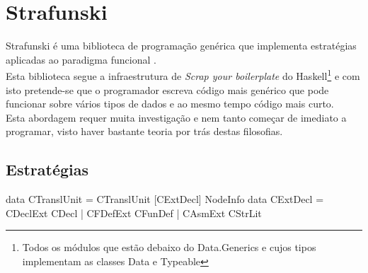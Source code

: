 \chapter{Strafunski}
\minitoc

Strafunski é uma biblioteca de programação genérica que implementa estratégias aplicadas ao paradigma funcional \cite{Lammel:2002:DPF:570186.570187,LV03-PADL}.\\
Esta biblioteca segue a infraestrutura de \textit{Scrap your boilerplate} \cite{SYB3} do
Haskell\footnote{Todos os módulos que estão debaixo do Data.Generics e cujos tipos implementam as classes Data e Typeable} e com isto pretende-se que o programador
escreva código mais genérico que pode funcionar sobre vários tipos de dados e ao mesmo tempo código mais curto.\\
Esta abordagem requer muita investigação e nem tanto começar de imediato a programar, visto haver bastante teoria por trás destas filosofias.

\section{Estratégias}


\begin{haskell}
data CTranslUnit = CTranslUnit [CExtDecl] NodeInfo
data CExtDecl = CDeclExt CDecl
              | CFDefExt CFunDef
              | CAsmExt CStrLit
\end{haskell}

